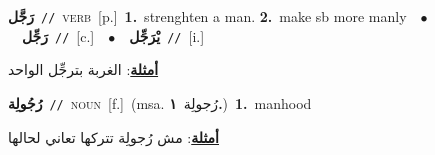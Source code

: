 \documentclass[10pt,a4paper,twoside]{article} %
\begin{document}
\begin{multicols}{2}
{\setlength\topsep{0pt}\textbf{\foreignlanguage{arabic}{رَجَّل}}\ {\color{gray}\texttt{//}\color{black}}\ \textsc{verb}\ [p.]\ \textbf{1.}~strenghten a man.  \textbf{2.}~make sb more manly\ \ $\bullet$\ \ \setlength\topsep{0pt}\textbf{\foreignlanguage{arabic}{رَجِّل}}\ {\color{gray}\texttt{//}\color{black}}\ [c.]\ \ $\bullet$\ \ \setlength\topsep{0pt}\textbf{\foreignlanguage{arabic}{يْرَجِّل}}\ {\color{gray}\texttt{//}\color{black}}\ [i.]\  \begin{flushright}\color{gray}\foreignlanguage{arabic}{\textbf{\underline{\foreignlanguage{arabic}{أمثلة}}}: الغربة بترجِّل الواحد}\end{flushright}\color{black}} \vspace{2mm}

{\setlength\topsep{0pt}\textbf{\foreignlanguage{arabic}{رُجُولِة}}\ {\color{gray}\texttt{//}\color{black}}\ \textsc{noun}\ [f.]\ \color{gray}(msa. \foreignlanguage{arabic}{رُجولِة}~\foreignlanguage{arabic}{\textbf{١.}})\color{black}\ \textbf{1.}~manhood\  \begin{flushright}\color{gray}\foreignlanguage{arabic}{\textbf{\underline{\foreignlanguage{arabic}{أمثلة}}}: مش رُجولِة تتركها تعاني لحالها}\end{flushright}\color{black}} \vspace{2mm}


\end{multicols}
\end{document}
